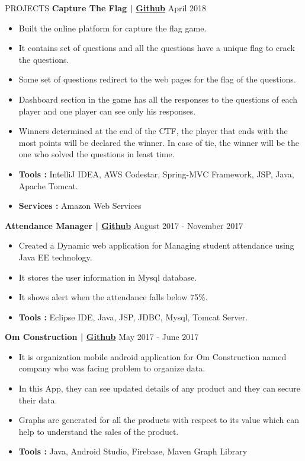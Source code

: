 \documentclass{resume} %
\begin{document}
\begin{rSection}{PROJECTS}
{\textbf{Capture The Flag | \href{https://github.com/abhi1d/capture-the-flag}{Github}}} \hfill April 2018{}{} 
\begin{itemize}
\item Built the online platform for capture the flag game. 
\item It contains set of questions and all the questions have a unique flag to crack the questions.
\item Some set of questions redirect to the web pages for the flag of the questions. 
\item Dashboard section in the game has all the responses to the questions of each player and one player can see only his responses.
\item Winners determined at the end of the CTF, the player that ends with the most points will be            declared the winner. In case of tie, the winner will be the one who solved the questions in least       time.
\item \textbf{Tools :} IntelliJ IDEA, AWS Codestar, Spring-MVC Framework, JSP, Java, Apache Tomcat.
\item \textbf{Services : }Amazon Web Services
\end{itemize}


{\textbf{Attendance Manager | \href{https://github.com/abhi1d/Attendance-Manager}{Github}}} \hfill August 2017 - November 2017{}{} 
\begin{itemize}
\item Created a Dynamic web application for Managing student attendance using Java EE technology. 
\item It stores the user information in Mysql database.
\item It shows alert when the attendance falls below 75\%.
\item \textbf{Tools :} Eclipse IDE, Java, JSP, JDBC, Mysql, Tomcat Server.
\end{itemize}


{\textbf{Om Construction | \href{https://github.com/abhi1d/OmConstruction}{Github}}} \hfill May 2017 - June 2017{}{} 
\begin{itemize}
\item It is organization mobile android application for Om Construction named company who was facing problem to organize data.
\item In this App, they can see updated details of any product and they can secure their data.
\item Graphs are generated for all the products with respect to its value which can help to understand the sales of the product.
\item \textbf{Tools :}  Java, Android Studio, Firebase, Maven Graph Library
\end{itemize}


\end{rSection}
\end{document}
